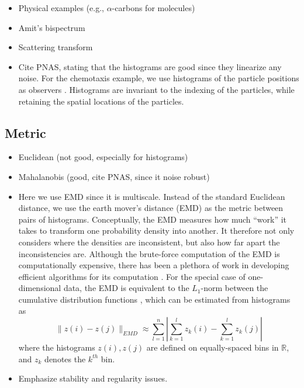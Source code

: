 \documentclass[preprint]{elsarticle}
\begin{document}
\begin{itemize}
\item Physical examples (e.g., $\alpha$-carbons for molecules)
\item Amit's bispectrum
\item Scattering transform
\item Cite PNAS, stating that the histograms are good since they linearize any noise. 
For the chemotaxis example, we use histograms of the particle positions as observers \cite{talmon2013empirical}. 
%
Histograms are invariant to the indexing of the particles, while retaining the spatial locations of the particles.
\end{itemize}

\subsection{Metric}

\begin{itemize}
\item Euclidean (not good, especially for histograms)
\item Mahalanobis (good, cite PNAS, since it noise robust)
\item Here we use EMD since it is multiscale.
%
Instead of the standard Euclidean distance, we use the earth mover's distance (EMD) \cite{rubner2000earth} as the metric between pairs of histograms. 
%
Conceptually, the EMD measures how much ``work'' it takes to transform one probability density into another.
%
It therefore not only considers where the densities are inconsistent, but also how far apart the inconsistencies are.
%
Although the brute-force computation of the EMD is computationally expensive, there has been a plethora of work in developing efficient algorithms for its computation \cite{Pele-eccv2008, Pele-iccv2009}.
%
For the special case of one-dimensional data, the EMD is equivalent to the $L_1$-norm between the cumulative distribution functions \cite{rubner2000perceptual}, which can be estimated from histograms as
\begin{equation}
\| z(i) - z(j) \|_{EMD} \approx \sum_{l=1}^{n} \left| \sum_{k=1}^l z_k(i) - \sum_{k=1}^l z_k(j) \right|
\end{equation}
where the histograms $z(i), z(j)$ are defined on equally-spaced bins in $\mathbb{R}$, and $z_k$ denotes the $k^{th}$ bin. 
%
\item Emphasize stability and regularity issues.
\end{itemize}
\end{document}
